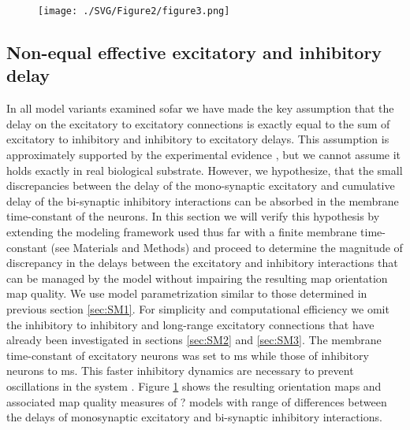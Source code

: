 \documentclass[a4paper,10pt]{article}
\begin{document}
\begin{figure}[htpb!] 
\centering
\texttt{[image: ./SVG/Figure2/figure3.png]}
\caption{}
\label{fig:figure3}
\end{figure} 

\subsection{Non-equal effective excitatory and inhibitory delay} \label{sec:SM4}

In all model variants examined sofar we have made the key assumption that the delay on the excitatory to excitatory connections is exactly equal 
to the sum of excitatory to inhibitory and inhibitory to excitatory delays. This assumption is approximately supported by the experimental evidence \cite{Ohana2012}, but we cannot assume it holds exactly in real biological substrate.  However, we hypothesize, that the small discrepancies between the delay of the mono-synaptic excitatory and cumulative delay of the bi-synaptic inhibitory interactions can be absorbed in the membrane time-constant of the neurons. In this section we will verify this hypothesis by extending the modeling framework used thus far with a finite membrane time-constant (see Materials and Methods) and proceed to determine the magnitude of discrepancy in the delays between the excitatory and inhibitory interactions that can be managed by the model without impairing the resulting map orientation map quality. We use model parametrization similar to those determined in previous section \ref{sec:SM1}. For simplicity and computational efficiency we omit the inhibitory to inhibitory and long-range excitatory connections that have already been investigated in sections \ref{sec:SM2} and \ref{sec:SM3}. The membrane time-constant of excitatory 
neurons was set to ms while those of inhibitory neurons to ms. This faster inhibitory dynamics are necessary to prevent oscillations in the system \cite{Kang2003}. 
Figure \ref{fig:figure3} shows the resulting orientation maps and associated map quality measures of ? models with range of differences between the delays of monosynaptic excitatory and bi-synaptic inhibitory interactions. 
 
\end{document}
